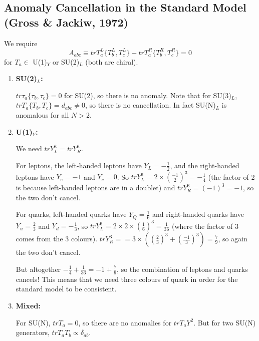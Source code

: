 \subsection{Anomaly Cancellation in the Standard Model (Gross \& Jackiw, 1972)}
%
We require
\begin{equation}
A_{abc} \equiv trT_a^L\{T_b^L,T_c^L\} - trT_a^R\{T_b^R,T_c^R\} = 0
\end{equation}
for $T_a \in$ U(1)$_Y$ or SU(2)$_L$ (both are chiral).
\begin{enumerate}
\item \textbf{SU(2)$_L$:}

$tr \tau_a \{\tau_b, \tau_c \} = 0$ for SU(2), so there is no anomaly. Note that for SU(3)$_L$, $trT_a\{T_b,T_c\}=d_{abc} \neq 0$, so there is no cancellation. In fact SU(N)$_L$ is anomalous for all $N >2$.
\item \textbf{U(1)$_Y$:} 

We need $tr Y_L^3 = tr Y_R^3$.

For leptons, the left-handed leptons have $Y_L = - \frac{1}{2}$, and the right-handed leptons have $Y_e = -1$ and $Y_\nu = 0$. So $tr Y_L^3 = 2 \times (\frac{-1}{2})^3 = -\frac{1}{4}$ (the factor of 2 is because left-handed leptons are in a doublet) and $tr Y_R^3 = (-1)^3 = -1$, so the two don't cancel.

For quarks, left-handed quarks have $Y_Q = \frac{1}{6}$ and right-handed quarks have $Y_u = \frac{2}{3}$ and $Y_d = - \frac{1}{3}$, so $tr Y_L^3 = 2\times 2 \times (\frac{1}{6})^3 = \frac{1}{36}$ (where the factor of 3 comes from the 3 colours). $tr Y_R^3 = = 3 \times ((\frac{2}{3})^3 + (\frac{-1}{3})^3) = \frac{7}{9}$, so again the two don't cancel.

But altogether $-\frac{1}{4} + \frac{1}{36} = -1 + \frac{7}{9}$, so the combination of leptons and quarks cancels! This means that we need three colours of quark in order for the standard model to be consistent. 

\item \textbf{Mixed: }

For SU(N), $tr T_a=0$, so there are no anomalies for $tr T_a Y^2$. But for two SU(N) generators, $tr T_a T_b \propto \delta_{ab}$.
\end{enumerate}